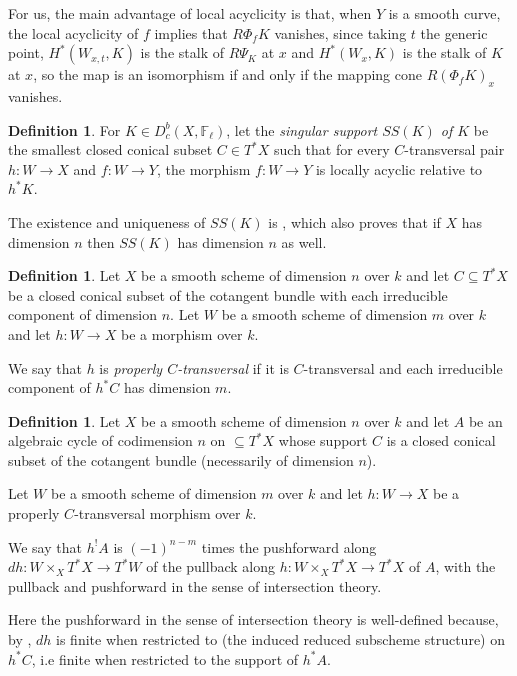 \documentclass[12pt]{amsart}
\theoremstyle{definition}
\newtheorem{definition}[theorem]{Definition}
\theoremstyle{remark}
\begin{document}
For us, the main advantage of local acyclicity is that, when $Y$ is a smooth curve, the local acyclicity of $f$ implies that $R\Phi_f K$ vanishes, since taking $t$ the generic point, $H^* ( W_{x,t}, K)$ is the stalk of $R \Psi_ K$ at $x$ and $H^* ( W_x, K) $ is the stalk of $K$ at $x$, so the map is an isomorphism if and only if the mapping cone $R(\Phi_f K)_x$ vanishes.

\begin{definition}\cite[1.3]{Beilinson} For $K \in D^b_c(X, \mathbb F_\ell)$, let the \emph{singular support $SS(K)$ of $K$} be the smallest closed conical subset $C \in T^* X$ such that for every $C$-transversal pair $h: W \to X$ and $f: W\to Y$, the morphism $f: W\to Y$ is locally acyclic relative to $h^* K$. 

\end{definition}
The existence and uniqueness of $SS(K)$ is \cite[Theorem 1.3]{Beilinson}, which also proves that if $X$ has dimension $n$ then $SS(K)$ has dimension $n$ as well.


\begin{definition}\cite[Definition 7.1(1)]{saito1} Let $X$ be a smooth scheme of dimension $n$ over $k$ and let $C \subseteq T^* X$ be a closed conical subset of the cotangent bundle with each irreducible component of dimension $n$. Let $W$ be a smooth scheme of dimension $m$ over $k$ and let $h: W \to X$ be a morphism over $k$.

We say that $h$ is \emph{properly $C$-transversal} if it is $C$-transversal and each irreducible component of $h^* C$ has dimension $m$. \end{definition} 

\begin{definition}\cite[Definition 7.1(2)]{saito1} Let $X$ be a smooth scheme of dimension $n$ over $k$ and let $A$ be an algebraic cycle of codimension $n$ on $\subseteq T^* X$ whose support $C$ is a closed conical subset of the cotangent bundle (necessarily of dimension $n$).

 Let $W$ be a smooth scheme of dimension $m$ over $k$ and let $h: W \to X$ be a properly $C$-transversal morphism over $k$.
 
 We say that $h^{!} A$ is $(-1)^{n-m}$ times the pushforward along $dh:  W \times_X T^* X \to T^* W$ of the pullback along $h:  W \times_X T^* X \to T^* X$ of $A$, with the pullback and pushforward in the sense of intersection theory.  \end{definition}

Here the pushforward in the sense of intersection theory is well-defined because, by \cite[Lemma 3.1]{saito1}, $dh$ is finite when restricted to (the induced reduced subscheme structure) on $h^* C$, i.e finite when restricted to the support of $h^* A$. 
\end{document}

